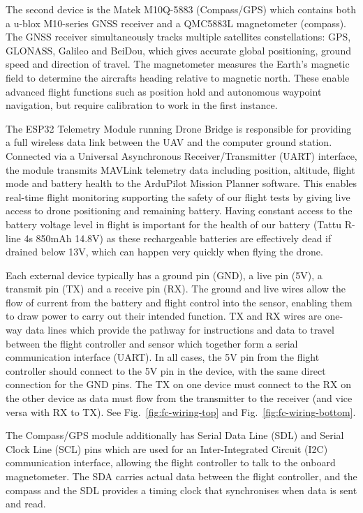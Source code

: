 \documentclass[conference]{IEEEtran}
\begin{document}
The second device is the Matek M10Q-5883 (Compass/GPS) which contains both a u-blox M10-series GNSS receiver and a QMC5883L magnetometer (compass). The GNSS receiver simultaneously tracks multiple satellites constellations: GPS, GLONASS, Galileo and BeiDou, which gives accurate global positioning, ground speed and direction of travel. The magnetometer measures the Earth's magnetic field to determine the aircrafts heading relative to magnetic north. These enable advanced flight functions such as position hold and autonomous waypoint navigation, but require calibration to work in the first instance.  

The ESP32 Telemetry Module running Drone Bridge is responsible for providing a full wireless data link between the UAV and the computer ground station. Connected via a Universal Asynchronous Receiver/Transmitter (UART) interface, the module transmits MAVLink telemetry data including position, altitude, flight mode and battery health to the ArduPilot Mission Planner software. This enables real-time flight monitoring supporting the safety of our flight tests by giving live access to drone positioning and remaining battery. Having constant access to the battery voltage level in flight is important for the health of our battery (Tattu R-line 4s 850mAh 14.8V) as these rechargeable batteries are effectively dead if drained below 13V, which can happen very quickly when flying the drone.  

Each external device typically has a ground pin (GND), a live pin (5V), a transmit pin (TX) and a receive pin (RX). The ground and live wires allow the flow of current from the battery and flight control into the sensor, enabling them to draw power to carry out their intended function. TX and RX wires are one-way data lines which provide the pathway for instructions and data to travel between the flight controller and sensor which together form a serial communication interface (UART). In all cases, the 5V pin from the flight controller should connect to the 5V pin in the device, with the same direct connection for the GND pins. The TX on one device must connect to the RX on the other device as data must flow from the transmitter to the receiver (and vice versa with RX to TX). See Fig.~\ref{fig:fc-wiring-top} and Fig.~\ref{fig:fc-wiring-bottom}.

The Compass/GPS module additionally has Serial Data Line (SDL) and Serial Clock Line (SCL) pins which are used for an Inter-Integrated Circuit (I2C) communication interface, allowing the flight controller to talk to the onboard magnetometer. The SDA carries actual data between the flight controller, and the compass and the SDL provides a timing clock that synchronises when data is sent and read.  
\end{document}
